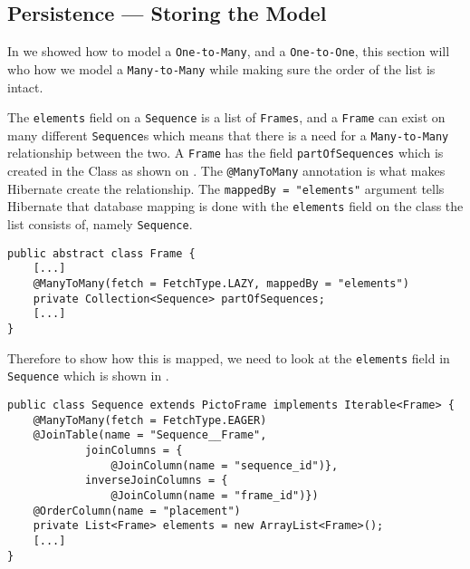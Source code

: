 \subsection{Persistence --- Storing the Model}
In  we showed how to model a \texttt{One-to-Many}, and a \texttt{One-to-One}, this section will who how we model a \texttt{Many-to-Many} while making sure the order of the list is intact.

The \texttt{elements} field on a \texttt{Sequence} is a list of \texttt{Frames}, and a \texttt{Frame} can exist on many different \texttt{Sequence}s which means that there is a need for a \texttt{Many-to-Many} relationship between the two.
A \texttt{Frame} has the field \texttt{partOfSequences} which is created in the Class as shown on .
The \texttt{@ManyToMany} annotation is what makes Hibernate create the relationship.
The \texttt{mappedBy = "elements"} argument tells Hibernate that database mapping is done with the \texttt{elements} field on the class the list consists of, namely \texttt{Sequence}.

\begin{lstlisting}[float, floatplacement=h, caption={The field \texttt{partOfSequences} in the \texttt{Frame} class. \texttt{[...]} denotes omitted code.},label={lst:frame-sequence}]
public abstract class Frame {
	[...]
    @ManyToMany(fetch = FetchType.LAZY, mappedBy = "elements")
    private Collection<Sequence> partOfSequences;
    [...]
}
\end{lstlisting}

Therefore to show how this is mapped, we need to look at the \texttt{elements} field in \texttt{Sequence} which is shown in .

\begin{lstlisting}[float, floatplacement=h, caption={The field elements in the \texttt{Sequence} class. \texttt{[...]} denotes omitted code.},label={lst:sequnce-frame}]
public class Sequence extends PictoFrame implements Iterable<Frame> {
    @ManyToMany(fetch = FetchType.EAGER)
    @JoinTable(name = "Sequence__Frame",
            joinColumns = {
                @JoinColumn(name = "sequence_id")},
            inverseJoinColumns = {
                @JoinColumn(name = "frame_id")})
    @OrderColumn(name = "placement")
    private List<Frame> elements = new ArrayList<Frame>();
    [...]
}
\end{lstlisting}

